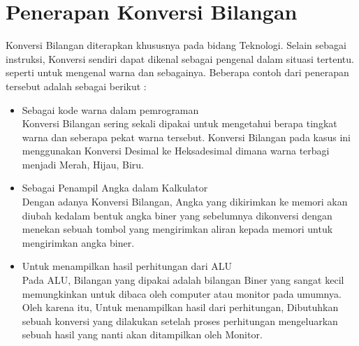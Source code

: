 \section{Penerapan Konversi Bilangan}
Konversi Bilangan diterapkan khususnya pada bidang Teknologi. Selain sebagai instruksi, Konversi sendiri dapat dikenal sebagai pengenal dalam situasi tertentu. seperti untuk mengenal warna dan sebagainya. Beberapa contoh dari penerapan tersebut adalah sebagai berikut : 
\begin{itemize}
\item Sebagai kode warna dalam pemrograman \\ Konversi Bilangan sering sekali dipakai untuk mengetahui berapa tingkat warna dan seberapa pekat warna tersebut. Konversi Bilangan pada kasus ini menggunakan Konversi Desimal ke Heksadesimal dimana warna terbagi menjadi Merah, Hijau, Biru. 
\item Sebagai Penampil Angka dalam Kalkulator \\ Dengan adanya Konversi Bilangan, Angka yang dikirimkan ke memori akan diubah kedalam bentuk angka biner yang sebelumnya dikonversi dengan menekan sebuah tombol yang mengirimkan aliran kepada memori untuk mengirimkan angka biner.
\item Untuk menampilkan hasil perhitungan dari ALU \\ Pada ALU, Bilangan yang dipakai adalah bilangan Biner yang sangat kecil memungkinkan untuk dibaca oleh computer atau monitor pada umumnya. Oleh karena itu, Untuk menampilkan hasil dari perhitungan, Dibutuhkan sebuah konversi yang dilakukan setelah proses perhitungan mengeluarkan sebuah hasil yang nanti akan ditampilkan oleh Monitor.
\end{itemize}

